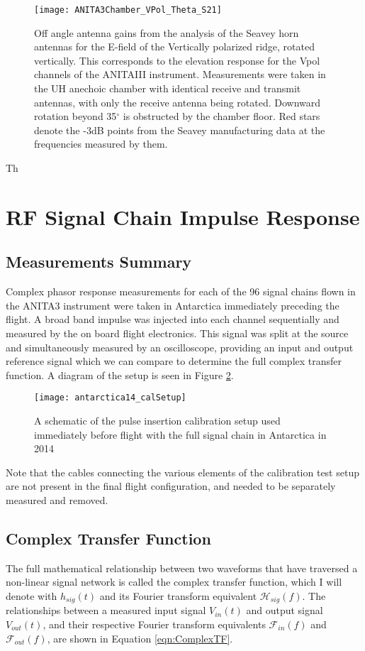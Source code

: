 \begin{figure}
\centering
	\texttt{[image: ANITA3Chamber\_VPol\_Theta\_S21]}
	\caption{Off angle antenna gains from the analysis of the Seavey horn antennas for the E-field of the Vertically polarized ridge, rotated vertically.  This corresponds to the elevation response for the Vpol channels of the ANITAIII instrument.  Measurements were taken in the UH anechoic chamber with identical receive and transmit antennas, with only the receive antenna being rotated.  Downward rotation beyond 35$^\circ$ is obstructed by the chamber floor.  Red stars denote the -3dB points from the Seavey manufacturing data at the frequencies measured by them.}
\label{fig:chamberVpol}
\end{figure}


Th


\section{RF Signal Chain Impulse Response}
		
	\subsection{Measurements Summary}
		Complex phasor response measurements for each of the 96 signal chains flown in the ANITA3 instrument were taken in Antarctica immediately preceding the flight. A broad band impulse was injected into each channel sequentially and measured by the on board flight electronics.  This signal was split at the source and simultaneously measured by an oscilloscope, providing an input and output reference signal which we can compare to determine the full complex transfer function.  A diagram of the setup is seen in Figure \ref{fig:sigChainSetup}.


\begin{figure}
	\texttt{[image: antarctica14\_calSetup]}
	\caption{A schematic of the pulse insertion calibration setup used immediately before flight with the full signal chain in Antarctica in 2014}
	\label{fig:sigChainSetup}
\end{figure}
			
	Note that the cables connecting the various elements of the calibration test setup are not present in the final flight configuration, and needed to be separately measured and removed.
			

		
	\subsection{Complex Transfer Function}
		The full mathematical relationship between two waveforms that have traversed a non-linear signal network is called the complex transfer function, which I will denote with $h_{sig}(t)$ and its Fourier transform equivalent $\mathcal{H}_{sig}(f)$.  The relationships between a measured input signal $V_{in}(t)$ and output signal $V_{out}(t)$, and their respective Fourier transform equivalents $\mathcal{F}_{in}(f)$ and $\mathcal{F}_{out}(f)$, are shown in Equation \ref{eqn:ComplexTF}.
	
